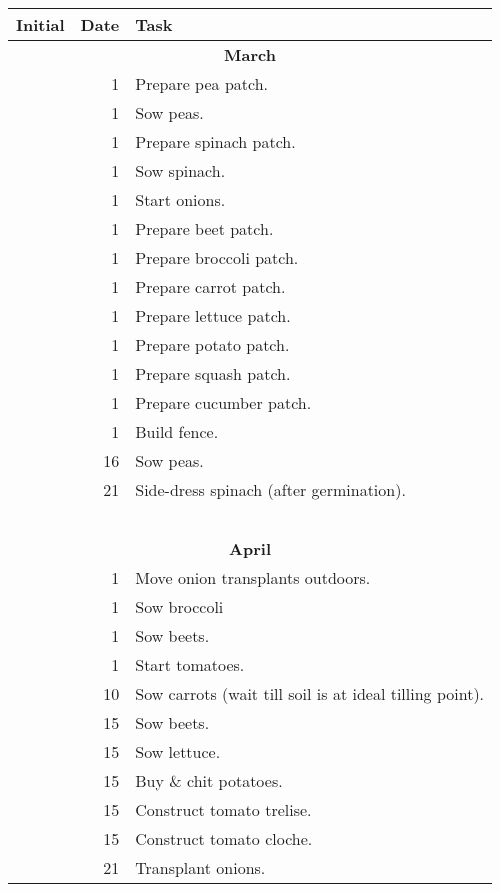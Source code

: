 \documentclass{article}
\begin{document}
\begin{longtable}{r|r|l}
	Initial & Date & Task \\ \hline
	\multicolumn{3}{c}{\textbf{March}} \\ \hline
	& 1 & Prepare pea patch. \\ \hline
	& 1 & Sow peas. \\ \hline
	& 1 & Prepare spinach patch. \\ \hline
	& 1 & Sow spinach. \\ \hline
	& 1 & Start onions. \\ \hline
	& 1 & Prepare beet patch. \\ \hline
	& 1 & Prepare broccoli patch. \\ \hline
	& 1 & Prepare carrot patch. \\ \hline
	& 1 & Prepare lettuce patch. \\ \hline
	& 1 & Prepare potato patch. \\ \hline
	& 1 & Prepare squash patch. \\ \hline
	& 1 & Prepare cucumber patch. \\ \hline
	& 1 & Build fence. \\ \hline
	& 16 & Sow peas. \\ \hline
	& 21 & Side-dress spinach (after germination). \\ \hline
	& & \\ \hline
	& & \\ \hline
	& & \\ \hline
	& & \\ \hline
	& & \\ \hline
	\multicolumn{3}{c}{\textbf{April}} \\ \hline
	& 1 & Move onion transplants outdoors. \\ \hline
	& 1 & Sow broccoli \\ \hline
	& 1 & Sow beets. \\ \hline
	& 1 & Start tomatoes. \\ \hline
	& 10 & Sow carrots (wait till soil is at ideal tilling point). \\ \hline
	& 15 & Sow beets. \\ \hline
	& 15 & Sow lettuce. \\ \hline
	& 15 & Buy \& chit potatoes. \\ \hline
	& 15 & Construct tomato trelise. \\ \hline
	& 15 & Construct tomato cloche. \\ \hline
	& 21 & Transplant onions. \\ \hline

\end{longtable}
\end{document}
